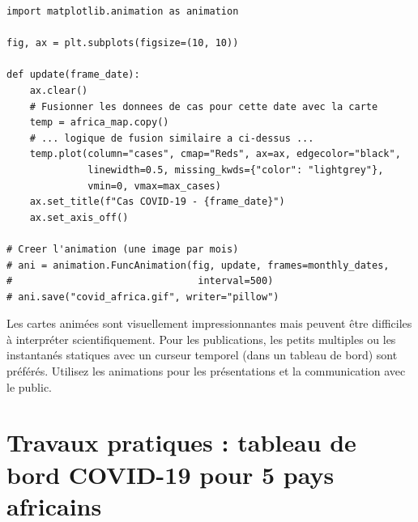 \begin{verbatim}
import matplotlib.animation as animation

fig, ax = plt.subplots(figsize=(10, 10))

def update(frame_date):
    ax.clear()
    # Fusionner les donnees de cas pour cette date avec la carte
    temp = africa_map.copy()
    # ... logique de fusion similaire a ci-dessus ...
    temp.plot(column="cases", cmap="Reds", ax=ax, edgecolor="black",
              linewidth=0.5, missing_kwds={"color": "lightgrey"},
              vmin=0, vmax=max_cases)
    ax.set_title(f"Cas COVID-19 - {frame_date}")
    ax.set_axis_off()

# Creer l'animation (une image par mois)
# ani = animation.FuncAnimation(fig, update, frames=monthly_dates,
#                                interval=500)
# ani.save("covid_africa.gif", writer="pillow")
\end{verbatim}

\begin{warningbox}
Les cartes anim\'ees sont visuellement impressionnantes mais peuvent \^etre difficiles \`a interpr\'eter scientifiquement. Pour les publications, les petits multiples ou les instantan\'es statiques avec un curseur temporel (dans un tableau de bord) sont pr\'ef\'er\'es. Utilisez les animations pour les pr\'esentations et la communication avec le public.
\end{warningbox}

\section{Travaux pratiques : tableau de bord COVID-19 pour 5 pays africains}

